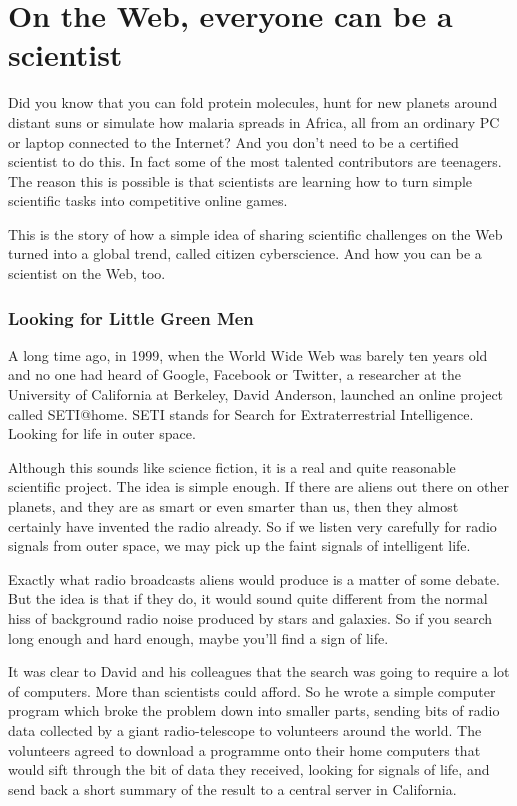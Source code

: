 \section{On the Web, everyone can be a scientist}
Did you know that you can fold protein molecules, hunt for new planets around distant suns or simulate how malaria spreads in Africa, all from an ordinary PC or laptop connected to the Internet? And you don’t need to be a certified scientist to do this. In fact some of the most talented contributors are teenagers. The reason this is possible is that scientists are learning how to turn simple scientific tasks into competitive online games. \par

This is the story of how a simple idea of sharing scientific challenges on the Web turned into a global trend, called citizen cyberscience. And how you can be a scientist on the Web, too.

\subsubsection{Looking for Little Green Men}
A long time ago, in 1999, when the World Wide Web was barely ten years old and no one had heard of Google, Facebook or Twitter, a researcher at the University of California at Berkeley, David Anderson, launched an online project called SETI@home. SETI stands for Search for Extraterrestrial Intelligence. Looking for life in outer space.\par

Although this sounds like science fiction, it is a real and quite reasonable scientific project. The idea is simple enough. If there are aliens out there on other planets, and they are as smart or even smarter than us, then they almost certainly have invented the radio already. So if we listen very carefully for radio signals from outer space, we may pick up the faint signals of intelligent life.\par

Exactly what radio broadcasts aliens would produce is a matter of some debate. But the idea is that if they do, it would sound quite different from the normal hiss of background radio noise produced by stars and galaxies. So if you search long enough and hard enough, maybe you’ll find a sign of life. 
\par
It was clear to David and his colleagues that the search was going to require a lot of computers. More than scientists could afford. So he wrote a simple computer program which broke the problem down into smaller parts, sending bits of radio data collected by a giant radio-telescope to volunteers around the world. The volunteers agreed to download a programme onto their home computers that would sift through the bit of data they received, looking for signals of life, and send back a short summary of the result to a central server in California. \par

